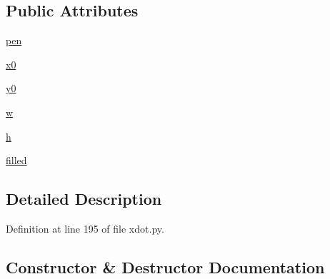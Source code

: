 \subsection*{Public Attributes}
\begin{DoxyCompactItemize}
\item 
\hyperlink{classsmacc__viewer_1_1xdot_1_1xdot_1_1EllipseShape_a4d04a594c784a4364ba27d247b47a951}{pen}
\item 
\hyperlink{classsmacc__viewer_1_1xdot_1_1xdot_1_1EllipseShape_a07cb1e682c863ae342c17263cd47d1c5}{x0}
\item 
\hyperlink{classsmacc__viewer_1_1xdot_1_1xdot_1_1EllipseShape_ac5b1c7c837f519afa1c005305ee823cb}{y0}
\item 
\hyperlink{classsmacc__viewer_1_1xdot_1_1xdot_1_1EllipseShape_af68f2823ce09ed7643269d10b0bbc886}{w}
\item 
\hyperlink{classsmacc__viewer_1_1xdot_1_1xdot_1_1EllipseShape_a2f7ac4a36e7a9a76cd8458a001dede67}{h}
\item 
\hyperlink{classsmacc__viewer_1_1xdot_1_1xdot_1_1EllipseShape_a3c929ec9287afe862e714a9190a04eda}{filled}
\end{DoxyCompactItemize}


\subsection{Detailed Description}


Definition at line 195 of file xdot.\+py.



\subsection{Constructor \& Destructor Documentation}
